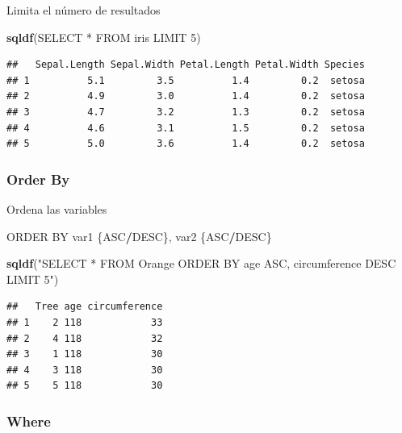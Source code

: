 \documentclass[
]{book}
\newenvironment{Shaded}{\begin{snugshade}}{\end{snugshade}}
\newcommand{\FunctionTok}[1]{\textcolor[rgb]{0.13,0.29,0.53}{\textbf{#1}}}
\newcommand{\NormalTok}[1]{#1}
\newcommand{\SpecialCharTok}[1]{\textcolor[rgb]{0.81,0.36,0.00}{\textbf{#1}}}
\newcommand{\StringTok}[1]{\textcolor[rgb]{0.31,0.60,0.02}{#1}}
\theoremstyle{break}
\theoremstyle{nonumberplain}
\begin{document}
Limita el número de resultados

\begin{Shaded}
\begin{Highlighting}[]
\FunctionTok{sqldf}\NormalTok{(}\StringTok{\textquotesingle{}SELECT * FROM iris LIMIT 5\textquotesingle{}}\NormalTok{)}
\end{Highlighting}
\end{Shaded}

\begin{verbatim}
##   Sepal.Length Sepal.Width Petal.Length Petal.Width Species
## 1          5.1         3.5          1.4         0.2  setosa
## 2          4.9         3.0          1.4         0.2  setosa
## 3          4.7         3.2          1.3         0.2  setosa
## 4          4.6         3.1          1.5         0.2  setosa
## 5          5.0         3.6          1.4         0.2  setosa
\end{verbatim}

\subsubsection{Order By}\label{order-by}

Ordena las variables

\begin{Shaded}
\begin{Highlighting}[]
\NormalTok{ORDER BY var1 \{ASC}\SpecialCharTok{/}\NormalTok{DESC\}, var2 \{ASC}\SpecialCharTok{/}\NormalTok{DESC\}}
\end{Highlighting}
\end{Shaded}

\begin{Shaded}
\begin{Highlighting}[]
\FunctionTok{sqldf}\NormalTok{(}\StringTok{"SELECT * FROM Orange ORDER BY age ASC, circumference DESC LIMIT 5"}\NormalTok{)}
\end{Highlighting}
\end{Shaded}

\begin{verbatim}
##   Tree age circumference
## 1    2 118            33
## 2    4 118            32
## 3    1 118            30
## 4    3 118            30
## 5    5 118            30
\end{verbatim}

\subsubsection{Where}\label{where}
\end{document}
